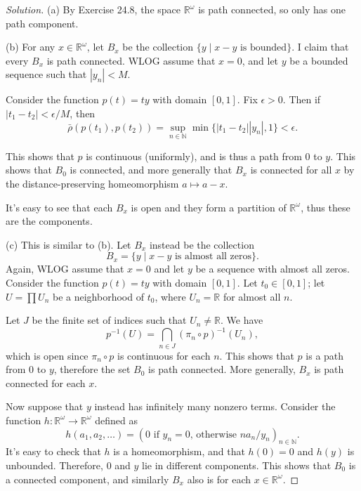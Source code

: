 \documentclass{article}
\theoremstyle{definition}
\begin{document}
\begin{proof}[Solution]
  (a) By Exercise 24.8, the space $\mathbb{R}^\omega$ is path connected, so only has one path component.

  (b) For any $x\in\mathbb{R}^\omega$, let $B_x$ be the collection $\{y\mid x - y\text{ is bounded}\}.$ I claim that every $B_x$ is path connected. WLOG assume that $x = 0$, and let $y$ be a bounded sequence such that $|y_n| < M$.

  Consider the function $p(t) = ty$ with domain $[0,1]$. Fix $\epsilon > 0$. Then if $|t_1 - t_2| < \epsilon/M$, then
  $$\bar{\rho}(p(t_1), p(t_2)) = \sup_{n\in\mathbb{N}} \min\{|t_1-t_2||y_n|,1\} < \epsilon.$$

  This shows that $p$ is continuous (uniformly), and is thus a path from $0$ to $y$. This shows that $B_0$ is connected, and more generally that $B_x$ is connected for all $x$ by the distance-preserving homeomorphism $a\mapsto a-x$.

  It's easy to see that each $B_x$ is open and they form a partition of $\mathbb{R}^\omega$, thus these are the components.

  (c) This is similar to (b). Let $B_x$ instead be the collection $$B_x = \{y\mid x-y\text{ is almost all zeros}\}.$$
  Again, WLOG assume that $x = 0$ and let $y$ be a sequence with almost all zeros. Consider the function $p(t) = ty$ with domain $[0,1]$. Let $t_0\in [0,1]$; let $U = \prod U_n$ be a neighborhood of $t_0$, where $U_n = \mathbb{R}$ for almost all $n$.

  Let $J$ be the finite set of indices such that $U_n\ne\mathbb{R}$. We have
  $$p^{-1}(U) = \bigcap_{n\in J} (\pi_n\circ p)^{-1}(U_n),$$
  which is open since $\pi_n\circ p$ is continuous for each $n$. This shows that $p$ is a path from $0$ to $y$, therefore the set $B_0$ is path connected. More generally, $B_x$ is path connected for each $x$.
  
  Now suppose that $y$ instead has infinitely many nonzero terms. Consider the function $h:\mathbb{R}^\omega\to\mathbb{R^\omega}$ defined as
  $$h(a_1,a_2,\dots) = (0\text{ if $y_n = 0$, otherwise } na_n/y_n)_{n\in\mathbb{N}}.$$
  It's easy to check that $h$ is a homeomorphism, and that $h(0) = 0$ and $h(y)$ is unbounded. Therefore, $0$ and $y$ lie in different components. This shows that $B_0$ is a connected component, and similarly $B_x$ also is for each $x\in\mathbb{R}^\omega$.

\end{proof}

\pagebreak
\end{document}
